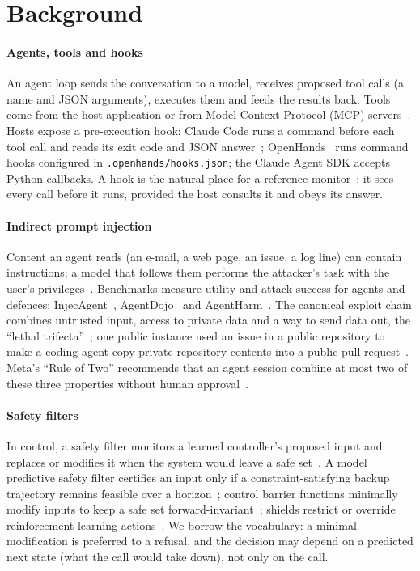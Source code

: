 \section{Background}
\label{sec:background}

\paragraph{Agents, tools and hooks}
An agent loop sends the conversation to a model, receives proposed tool calls (a name and JSON arguments), executes them and feeds the results back. Tools come from the host application or from Model Context Protocol (MCP) servers~\cite{mcp}. Hosts expose a pre-execution hook: Claude Code runs a command before each tool call and reads its exit code and JSON answer~\cite{claudehooks}; OpenHands~\cite{openhands} runs command hooks configured in \texttt{.openhands/hooks.json}; the Claude Agent SDK accepts Python callbacks. A hook is the natural place for a reference monitor~\cite{anderson}: it sees every call before it runs, provided the host consults it and obeys its answer.

\paragraph{Indirect prompt injection}
Content an agent reads (an e-mail, a web page, an issue, a log line) can contain instructions; a model that follows them performs the attacker's task with the user's privileges~\cite{greshake}. Benchmarks measure utility and attack success for agents and defences: InjecAgent~\cite{injecagent}, AgentDojo~\cite{agentdojo} and AgentHarm~\cite{agentharm}. The canonical exploit chain combines untrusted input, access to private data and a way to send data out, the ``lethal trifecta''~\cite{trifecta}; one public instance used an issue in a public repository to make a coding agent copy private repository contents into a public pull request~\cite{invariantgithub}. Meta's ``Rule of Two'' recommends that an agent session combine at most two of these three properties without human approval~\cite{ruleoftwo}.

\paragraph{Safety filters}
In control, a safety filter monitors a learned controller's proposed input and replaces or modifies it when the system would leave a safe set~\cite{hsu}. A model predictive safety filter certifies an input only if a constraint-satisfying backup trajectory remains feasible over a horizon~\cite{wabersich}; control barrier functions minimally modify inputs to keep a safe set forward-invariant~\cite{ames}; shields restrict or override reinforcement learning actions~\cite{shielding}. We borrow the vocabulary: a minimal modification is preferred to a refusal, and the decision may depend on a predicted next state (what the call would take down), not only on the call.

